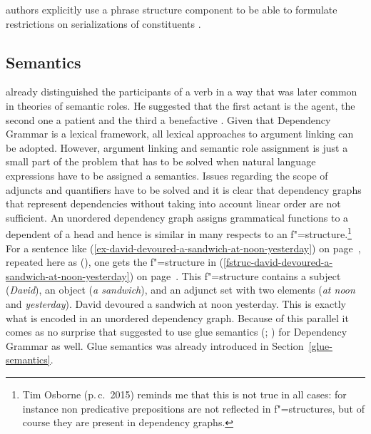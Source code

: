 authors explicitly use a phrase structure component to be able to formulate restrictions on
serializations of constituents \citep{GK2001a,Hellwig2003a}. 



\subsection{Semantics}

\tes already distinguished the participants of a verb in a way that was later common in theories of
semantic roles. He suggested that the first actant is the agent, the second one a patient and the
third a benefactive \citep[Chapter~106]{Tesniere2015a-u}.
Given that Dependency Grammar is a lexical framework, all
lexical approaches to argument linking can be adopted. However, argument linking and semantic
role assignment is just a small part of the problem that has to be solved when natural language
expressions have to be assigned a semantics. 
Issues regarding the scope of adjuncts and quantifiers
have to be solved and it is clear that dependency graphs that represent dependencies without taking
into account linear order are not sufficient. An unordered dependency graph assigns grammatical
functions to a dependent of a head and hence is similar in many respects to an \lfg
f"=structure.\footnote{
Tim Osborne (p.\,c.\ 2015) reminds me that this is not true in all cases: for instance non
predicative prepositions are not reflected in f"=structures, but of course they are present in
dependency graphs.
} For a sentence
like (\ref{ex-david-devoured-a-sandwich-at-noon-yesterday}) on page~\pageref{ex-david-devoured-a-sandwich-at-noon-yesterday}, repeated here as (), one gets
the f"=structure in (\ref{fstruc-david-devoured-a-sandwich-at-noon-yesterday}) on
page~\pageref{fstruc-david-devoured-a-sandwich-at-noon-yesterday}. This f"=structure contains a
subject (\emph{David}), an object (\emph{a sandwich}), and an adjunct set with two elements
(\emph{at noon} and \emph{yesterday}).
\ea
\label{ex-david-devoured-a-sandwich-at-noon-yesterday-two}
David devoured a sandwich at noon yesterday.
\z
This is exactly what is encoded in an unordered dependency graph. Because of this parallel it comes
as no surprise that \citet[]{Broeker2003a-u} suggested to use glue semantics
(\citealp*{DLS93a-u}; \citealp[Chapter~8]{Dalrymple2001a-u}) for Dependency
Grammar as well. Glue semantics was already introduced in Section~\ref{glue-semantics}.

